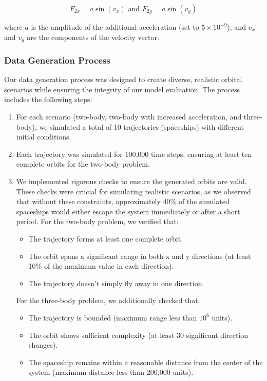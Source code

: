 \documentclass[12pt,a4paper]{article}
\begin{document}
\[F_{2x} = a \sin(v_x) \text{ and } F_{2y} = a \sin(v_y)\]

where $a$ is the amplitude of the additional acceleration (set to $5 \times 10^{-9}$), and $v_x$ and $v_y$ are the components of the velocity vector.
\subsubsection{Data Generation Process}
Our data generation process was designed to create diverse, realistic orbital scenarios while ensuring the integrity of our model evaluation. The process includes the following steps:

\begin{enumerate}
    \item For each scenario (two-body, two-body with increased acceleration, and three-body), we simulated a total of 10 trajectories (spaceships) with different initial conditions.
    \item Each trajectory was simulated for 100,000 time steps, ensuring at least ten complete orbits for the two-body problem.
    \item We implemented rigorous checks to ensure the generated orbits are valid. These checks were crucial for simulating realistic scenarios, as we observed that without these constraints, approximately 40\% of the simulated spaceships would either escape the system immediately or after a short period. For the two-body problem, we verified that:
    \begin{itemize}
        \item The trajectory forms at least one complete orbit.
        \item The orbit spans a significant range in both x and y directions (at least 10\% of the maximum value in each direction).
        \item The trajectory doesn't simply fly away in one direction.
    \end{itemize}
    For the three-body problem, we additionally checked that:
    \begin{itemize}
        \item The trajectory is bounded (maximum range less than $10^6$ units).
        \item The orbit shows sufficient complexity (at least 30 significant direction changes).
        \item The spaceship remains within a reasonable distance from the center of the system (maximum distance less than 200,000 units).
    \end{itemize}

\end{enumerate}
\end{document}
